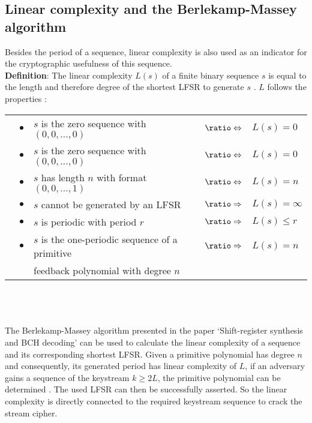 \clearpage

\subsection{Linear complexity and the Berlekamp-Massey algorithm}

Besides the period of a sequence, linear complexity is also used as an indicator for the cryptographic usefulness of this sequence. \\

\textbf{Definition}: The linear complexity $L(s)$ of a finite binary sequence $s$ is equal to the length and therefore degree of the shortest LFSR to generate $s$ \cite[p. 233]{Smart.2016}. $L$ follows the properties \cite[pp. 20-21]{Cusick.2009}:\\

\bgroup
\def\arraystretch{1.2}
\begin{tabular}{lllll}
	&$\bullet$&$s$ is the zero sequence with $(0, 0, ..., 0)$ & $\logeq$ & $L(s)=0$ \\
	&$\bullet$& $s$ is the zero sequence with $(0, 0, ..., 0)$& $\logeq$ & $L(s)=0$   \\
	&$\bullet$& $s$ has length $n$ with format $(0, 0, ..., 1)$ & $\logeq$ & $L(s) = n$\\
	&$\bullet$& $s$ cannot be generated by an LFSR  & $\logright$ & $ L(s) = \infty$\\
	&$\bullet$&  $s$ is periodic with period $r$ & $\logright$ & $L(s) \leq  r$\\
	&$\bullet$& $s$ is the one-periodic sequence of a primitive  & $\logright$ & $L(s) = n$ \\
	&&feedback polynomial with degree $n$&& \\
\end{tabular}
\egroup
\\\\\\
The Berlekamp-Massey algorithm presented in the paper ‘Shift-register synthesis and BCH decoding’ can be used to calculate the linear complexity of a sequence and its corresponding shortest LFSR. Given a primitive polynomial has degree $n$ and consequently, its generated period has linear complexity of $L$, if an adversary gains a sequence of the keystream $k \geq 2L$, the primitive polynomial can be determined \cite[pp. 124-125]{Massey.1969}. The used LFSR can then be successfully asserted. So the linear complexity is directly connected to the required keystream sequence to crack the stream cipher. \\

